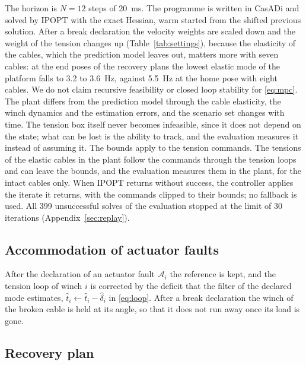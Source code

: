\documentclass{interact}
\begin{document}
The horizon is $N=12$ steps of 20~ms. The programme is written in CasADi \citep{andersson2019casadi} and solved by IPOPT \citep{wachter2006ipopt} with the exact Hessian, warm started from the shifted previous solution. After a break declaration the velocity weights are scaled down and the weight of the tension changes up (Table~\ref{tab:settings}), because the elasticity of the cables, which the prediction model leaves out, matters more with seven cables: at the end poses of the recovery plans the lowest elastic mode of the platform falls to 3.2 to 3.6~Hz, against 5.5~Hz at the home pose with eight cables. We do not claim recursive feasibility or closed loop stability for \eqref{eq:mpc}. The plant differs from the prediction model through the cable elasticity, the winch dynamics and the estimation errors, and the scenario set changes with time. The tension box itself never becomes infeasible, since it does not depend on the state; what can be lost is the ability to track, and the evaluation measures it instead of assuming it. The bounds apply to the tension commands. The tensions of the elastic cables in the plant follow the commands through the tension loops and can leave the bounds, and the evaluation measures them in the plant, for the intact cables only. When IPOPT returns without success, the controller applies the iterate it returns, with the commands clipped to their bounds; no fallback is used. All 399 unsuccessful solves of the evaluation stopped at the limit of 30 iterations (Appendix~\ref{sec:replay}).

\subsection{Accommodation of actuator faults}\label{sec:accommodation}

After the declaration of an actuator fault $\mathcal A_i$ the reference is kept, and the tension loop of winch $i$ is corrected by the deficit that the filter of the declared mode estimates, $\hat t_i\leftarrow\hat t_i-\hat\delta_i$ in \eqref{eq:loop}. After a break declaration the winch of the broken cable is held at its angle, so that it does not run away once its load is gone.

\subsection{Recovery plan}\label{sec:planner}
\end{document}
